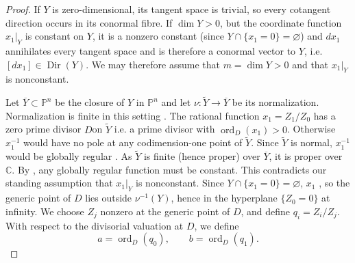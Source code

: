 \documentclass[11pt]{amsart}
\numberwithin{equation}{section}
\theoremstyle{plain}
\theoremstyle{remark}
\newcommand{\ord}{\operatorname{ord}}
\begin{document}
\begin{proof}
If $Y$ is zero-dimensional, its tangent space is trivial, so every cotangent direction occurs in its conormal
fibre. If $\dim Y>0$, but the coordinate function $x_1|_Y$ is constant on $Y$, it is a nonzero constant (since $Y\cap \{x_1=0\} = \varnothing$) and $dx_1$ annihilates every tangent space and is therefore a conormal vector to $Y$, i.e. $[dx_1]\in \operatorname{Dir}(Y)$. We may therefore assume that $m=\dim Y>0$ and that $x_1|_Y$ is nonconstant.

Let $\overline Y\subset\mathbb P^n$ be the closure of $Y$ in $\mathbb P^n$ and let
$\nu:\widetilde Y\to\overline Y$ be its normalization. Normalization is
finite in this setting \cite[, Lemma~33.27.1]{Stacks}.
The rational function $x_1=Z_1/Z_0$ has a zero prime divisor $D$\AIadd{ }on
$\widetilde Y$\AIreplace{, ,}{,} i.e. a prime divisor with $\ord_D(x_1)>0$. Otherwise $x_1^{-1}$ would have no pole at any codimension-one point of $\widetilde Y$. Since $\widetilde Y$ is normal,
$x_1^{-1}$ would be globally regular \cite[Tag 031T]{Stacks}.
As $\widetilde Y$ is finite (hence proper) over $\overline Y$, it is proper over $\mathbb C$.
 By \cite[, Lemma~33.26.2]{Stacks}, any globally regular function must be constant. This contradicts our standing assumption that $x_1|_Y$ is nonconstant.
Since $Y\cap \{x_1=0\}=\varnothing$, $x_1$ , so the generic point
of $D$ lies outside $\nu^{-1}(Y)$, hence in the hyperplane $\{Z_0 = 0\}$ at infinity. %
We choose $Z_j$ nonzero at the generic point of $D$, and define
$q_i=Z_i/Z_j$. With respect to the divisorial valuation at $D$, we define
\begin{equation}a=\operatorname{ord}_D(q_0),\qquad
 b=\operatorname{ord}_D(q_1).
\label{eq:ab}\end{equation}

\end{proof}
\end{document}

